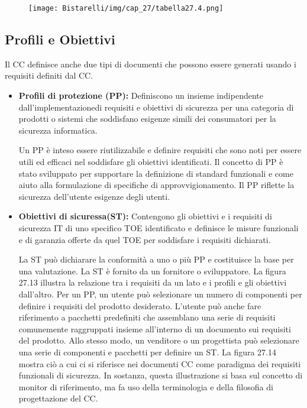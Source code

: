 \begin{figure}[H]
	\centering
    \texttt{[image: Bistarelli/img/cap\_27/tabella27.4.png]}
\end{figure}
\newpage
\subsection{Profili e Obiettivi}
Il CC definisce anche due tipi di documenti che possono essere generati usando i requisiti definiti dal CC.

\begin{itemize}
    \item \textbf{Profili di protezione (PP):} Definiscono un insieme indipendente dall'implementazionedi requisiti e obiettivi di sicurezza per una categoria di prodotti o sistemi che soddisfano esigenze simili dei consumatori per la sicurezza informatica.
    
    Un PP è inteso essere riutilizzabile e definire requisiti che sono noti per essere utili ed efficaci nel soddisfare gli obiettivi identificati. Il concetto di PP è stato sviluppato per supportare la definizione di standard funzionali e come aiuto alla formulazione di specifiche di approvvigionamento. Il PP riflette la sicurezza dell'utente esigenze degli utenti.
    
    \item \textbf{Obiettivi di sicuressa(ST):} Contengono gli obiettivi e i requisiti di sicurezza IT di uno specifico TOE identificato e definisce le misure funzionali e di garanzia offerte da quel TOE per soddisfare i requisiti dichiarati. 
    
   La ST può dichiarare la conformità a uno o più PP e costituisce la base per una valutazione. La ST è fornito da un fornitore o sviluppatore. La figura 27.13 illustra la relazione tra i requisiti da un lato e i profili e gli obiettivi dall'altro. Per un PP, un utente può selezionare un numero di componenti per definire i requisiti del prodotto desiderato. L'utente può anche fare riferimento a pacchetti predefiniti che assemblano una serie di requisiti comunemente raggruppati insieme all'interno di un documento sui requisiti del prodotto. Allo stesso modo, un venditore o un progettista può selezionare una serie di componenti e pacchetti per definire un ST. La figura 27.14 mostra ciò a cui ci si riferisce nei documenti CC come paradigma dei requisiti funzionali di sicurezza. In sostanza, questa illustrazione si basa sul concetto di monitor di riferimento, ma fa uso della terminologia e della filosofia di progettazione del CC.
\end{itemize}
\newpage
